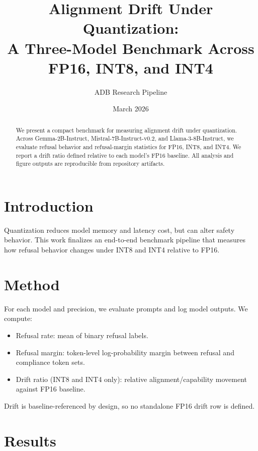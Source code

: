 \documentclass[11pt]{article}
\title{Alignment Drift Under Quantization:\\A Three-Model Benchmark Across FP16, INT8, and INT4}
\author{ADB Research Pipeline}
\date{March 2026}
\begin{document}
\maketitle

\begin{abstract}
We present a compact benchmark for measuring alignment drift under quantization.
Across Gemma-2B-Instruct, Mistral-7B-Instruct-v0.2, and Llama-3-8B-Instruct,
we evaluate refusal behavior and refusal-margin statistics for FP16, INT8, and INT4.
We report a drift ratio defined relative to each model's FP16 baseline.
All analysis and figure outputs are reproducible from repository artifacts.
\end{abstract}

\section{Introduction}
Quantization reduces model memory and latency cost, but can alter safety behavior.
This work finalizes an end-to-end benchmark pipeline that measures how refusal behavior
changes under INT8 and INT4 relative to FP16.

\section{Method}
For each model and precision, we evaluate prompts and log model outputs.
We compute:
\begin{itemize}
	\item Refusal rate: mean of binary refusal labels.
	\item Refusal margin: token-level log-probability margin between refusal and compliance token sets.
	\item Drift ratio (INT8 and INT4 only): relative alignment/capability movement against FP16 baseline.
\end{itemize}

Drift is baseline-referenced by design, so no standalone FP16 drift row is defined.

\section{Results}
\end{document}
